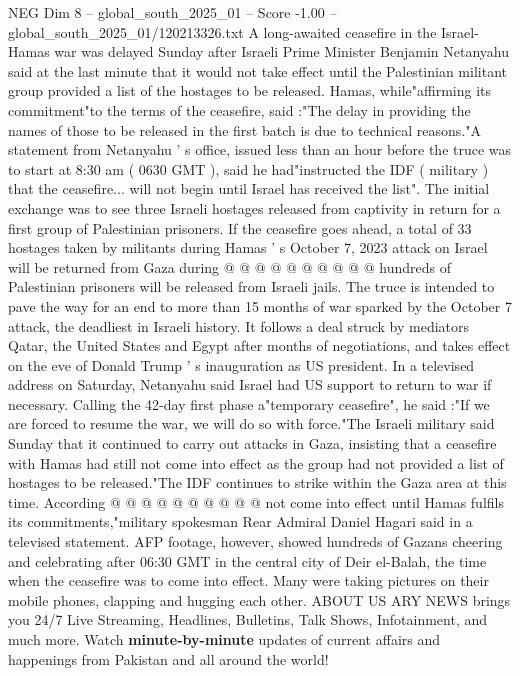 \begin{textsample}{NEG Dim 8 – global\_south\_2025\_01 – Score -1.00 – global\_south\_2025\_01/120213326.txt}  \label{ex:f8_neg_337}
A long-awaited ceasefire in the Israel-Hamas war was delayed Sunday after Israeli Prime Minister Benjamin Netanyahu said at the last minute that it would not take effect until the Palestinian militant group provided a list of the hostages to be released.
Hamas, while"affirming its commitment"to the terms of the ceasefire, said :"The delay in providing the names of those to be released in the first batch is due to technical reasons."A statement from Netanyahu ' s office, issued less than an hour before the truce was to start at 8:30 am ( 0630 GMT ), said he had"instructed the IDF ( military ) that the ceasefire... will not begin until Israel has received the list".
The initial exchange was to see three Israeli hostages released from captivity in return for a first group of Palestinian prisoners.
If the ceasefire goes ahead, a total of 33 hostages taken by militants during Hamas ' s October 7, 2023 attack on Israel will be returned from Gaza during @ @ @ @ @ @ @ @ @ @ hundreds of Palestinian prisoners will be released from Israeli jails.
The truce is intended to pave the way for an end to more than 15 months of war sparked by the October 7 attack, the deadliest in Israeli history.
It follows a deal struck by mediators Qatar, the United States and Egypt after months of negotiations, and takes effect on the eve of Donald Trump ' s inauguration as US president.
In a televised address on Saturday, Netanyahu said Israel had US support to return to war if necessary.
Calling the 42-day first phase a"temporary ceasefire", he said :"If we are forced to resume the war, we will do so with force."The Israeli military said Sunday that it continued to carry out attacks in Gaza, insisting that a ceasefire with Hamas had still not come into effect as the group had not provided a list of hostages to be released."The IDF continues to strike within the Gaza area at this time.
According @ @ @ @ @ @ @ @ @ @ not come into effect until Hamas fulfils its commitments,"military spokesman Rear Admiral Daniel Hagari said in a televised statement.
AFP footage, however, showed hundreds of Gazans cheering and celebrating after 06:30 GMT in the central city of Deir el-Balah, the time when the ceasefire was to come into effect.
Many were taking pictures on their mobile phones, clapping and hugging each other.
ABOUT US ARY NEWS brings you 24/7 Live Streaming, Headlines, Bulletins, Talk Shows, Infotainment, and much more.
Watch \textbf{minute-by-minute} updates of current affairs and happenings from Pakistan and all around the world!

\end{textsample}
